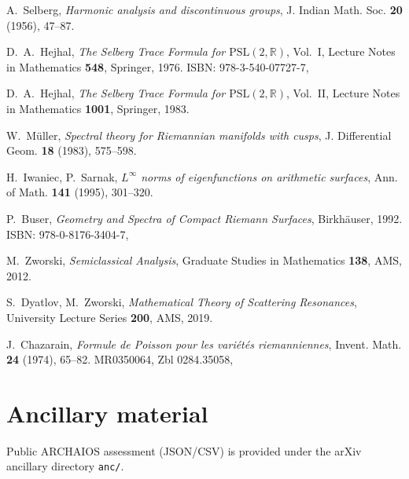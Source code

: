 \documentclass[12pt]{amsart}
\numberwithin{equation}{section}
\theoremstyle{plain}
\theoremstyle{definition}
\theoremstyle{remark}
\begin{document}
\begin{thebibliography}{99}

A.~Selberg,
\textit{Harmonic analysis and discontinuous groups},
J. Indian Math. Soc. \textbf{20} (1956), 47--87.

D.~A.~Hejhal,
\textit{The Selberg Trace Formula for $\mathrm{PSL}(2,\mathbb{R})$}, Vol.~I,
Lecture Notes in Mathematics \textbf{548}, Springer, 1976.
ISBN: 978-3-540-07727-7, 

D.~A.~Hejhal,
\textit{The Selberg Trace Formula for $\mathrm{PSL}(2,\mathbb{R})$}, Vol.~II,
Lecture Notes in Mathematics \textbf{1001}, Springer, 1983.

W.~M\"uller,
\textit{Spectral theory for Riemannian manifolds with cusps},
J. Differential Geom. \textbf{18} (1983), 575--598.

H.~Iwaniec, P.~Sarnak,
\textit{$L^\infty$ norms of eigenfunctions on arithmetic surfaces},
Ann. of Math. \textbf{141} (1995), 301--320.

P.~Buser,
\textit{Geometry and Spectra of Compact Riemann Surfaces},
Birkh\"auser, 1992.
ISBN: 978-0-8176-3404-7, 

M.~Zworski,
\textit{Semiclassical Analysis},
Graduate Studies in Mathematics \textbf{138}, AMS, 2012.

S.~Dyatlov, M.~Zworski,
\textit{Mathematical Theory of Scattering Resonances},
University Lecture Series \textbf{200}, AMS, 2019.

J.~Chazarain,
\textit{Formule de Poisson pour les vari\'et\'es riemanniennes},
Invent. Math. \textbf{24} (1974), 65--82.
MR0350064, Zbl 0284.35058, 

\end{thebibliography}
\section*{Ancillary material}
Public ARCHAIOS assessment (JSON/CSV) is provided under the arXiv ancillary directory \texttt{anc/}.
\end{document}
